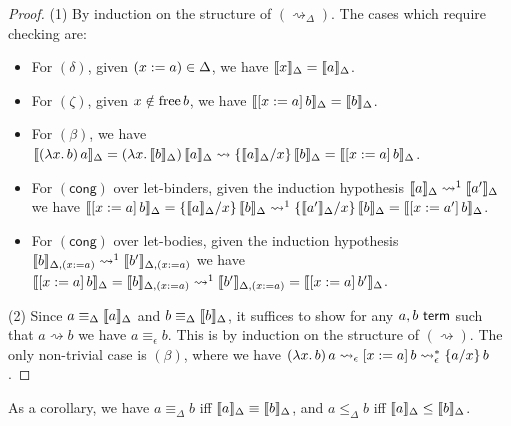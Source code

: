 \documentclass[twoside]{report}
\begin{document}
\begin{proof}
(1) By induction on the structure of $(\rightsquigarrow_\Delta)$. The cases which require checking are:

\begin{itemize}[noitemsep]
    \item For $(\delta)$, given $(x \defeq a) \in \Delta$, we have $\inter{x}_\Delta = \inter{a}_\Delta$.

    \item For $(\zeta)$, given $x \notin \free b$, we have $\inter{\llet x a b}_\Delta = \inter{b}_\Delta$.

    \item For $(\beta)$, we have $\inter{\app {(\lam x b)} a}_\Delta = \app {(\lam x {\inter{b}_\Delta})} {\inter{a}_\Delta} \rightsquigarrow \subst x {\inter{a}_\Delta} {\inter{b}_\Delta} = \inter{\llet x a b}_\Delta$.

    \item For $(\mathsf{cong})$ over let-binders, given the induction hypothesis $\inter{a}_\Delta \rightsquigarrow^1 \inter{a'}_\Delta$ we have $\inter{\llet x a b}_\Delta = \subst x {\inter{a}_\Delta} {\inter{b}_\Delta} \rightsquigarrow^1 \subst x {\inter{a'}_\Delta} {\inter{b}_\Delta} = \inter{\llet x {a'} b}_\Delta$.

    \item For $(\mathsf{cong})$ over let-bodies, given the induction hypothesis $\inter{b}_{\Delta, (x \defeq a)} \rightsquigarrow^1 \inter{b'}_{\Delta, (x \defeq a)}$ we have $\inter{\llet x a b}_\Delta = \inter{b}_{\Delta, (x \defeq a)} \rightsquigarrow^1 \inter{b'}_{\Delta, (x \defeq a)} = \inter{\llet x a {b'}}_\Delta$.
\end{itemize}

(2) Since $a \equiv_\Delta \inter{a}_\Delta$ and $b \equiv_\Delta \inter{b}_\Delta$, it suffices to show for any $a, b \termo$ such that $a \rightsquigarrow b$ we have $a \equiv_\epsilon b$. This is by induction on the structure of $(\rightsquigarrow)$. The only non-trivial case is $(\beta)$, where we have $\app {(\lam x b)} a \rightsquigarrow_\epsilon \llet x a b \rightsquigarrow_\epsilon^\ast \subst x a b$.
\end{proof}

As a corollary, we have $a \equiv_\Delta b$ iff $\inter{a}_\Delta \equiv \inter{b}_\Delta$, and $a \leq_\Delta b$ iff $\inter{a}_\Delta \leq \inter{b}_\Delta$.
\end{document}
